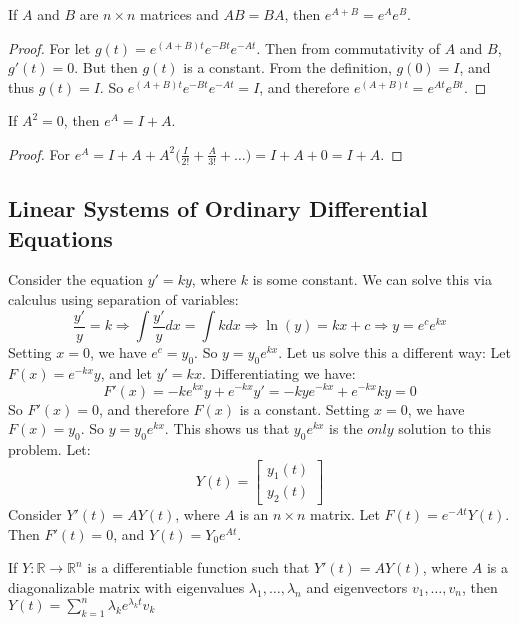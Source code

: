 \documentclass[crop=false,class=book,oneside]{standalone}
\begin{document}
\begin{theorem}
If $A$ and $B$ are $n\times n$ matrices and $AB=BA$, then $e^{A+B} = e^{A}e^{B}$.
\end{theorem}
\begin{proof}
For let $g(t) = e^{(A+B)t}e^{-Bt}e^{-At}$. Then from commutativity of $A$ and $B$, $g'(t) = 0$. But then $g(t)$ is a constant. From the definition, $g(0) = I$, and thus $g(t) = I$. So $e^{(A+B)t}e^{-Bt}e^{-At} = I$, and therefore $e^{(A+B)t} = e^{At}e^{Bt}$.
\end{proof}
\begin{theorem}
If $A^{2} = 0$, then $e^{A} = I+A$.
\end{theorem}
\begin{proof}
For $e^{A} = I+A+A^{2}\big(\frac{I}{2!}+\frac{A}{3!}+\hdots\big) = I+A+0 = I+A$.
\end{proof}
\subsection{Linear Systems of Ordinary Differential Equations}
Consider the equation $y' = ky$, where $k$ is some constant. We can solve this via calculus using separation of variables:
\begin{equation*}
    \frac{y'}{y} = k\Rightarrow \int \frac{y'}{y}dx = \int kdx \Rightarrow \ln(y) = kx+c \Rightarrow y = e^c e^{kx}    
\end{equation*}
Setting $x=0$, we have $e^c = y_0$. So $y = y_0e^{kx}$. Let us solve this a different way: Let $F(x) = e^{-kx}y$, and let $y'=kx$. Differentiating we have:
\begin{equation*}
    F'(x)=-ke^{kx}y+e^{-kx}y'=-kye^{-kx}+e^{-kx}ky=0    
\end{equation*}
So $F'(x) = 0$, and therefore $F(x)$ is a constant. Setting $x=0$, we have $F(x) = y_0$. So $y = y_0e^{kx}$. This shows us that $y_0e^{kx}$ is the $only$ solution to this problem. Let:
\begin{equation*}
    Y(t) = \begin{bmatrix} y_1(t) \\ y_2(t)\end{bmatrix}    
\end{equation*}
Consider $Y'(t) = AY(t)$, where $A$ is an $n\times n$ matrix. Let $F(t) = e^{-At}Y(t)$. Then $F'(t) = 0$, and $Y(t) = Y_0 e^{At}$.
\begin{theorem}
If $Y:\mathbb{R}\rightarrow \mathbb{R}^n$ is a differentiable function such that $Y'(t) = AY(t)$, where $A$ is a diagonalizable matrix with eigenvalues $\lambda_1,\hdots, \lambda_n$ and eigenvectors $v_1,\hdots, v_n$, then $Y(t) = \sum_{k=1}^{n} \lambda_k e^{\lambda_k t}v_k$
\end{theorem}
\end{document}
